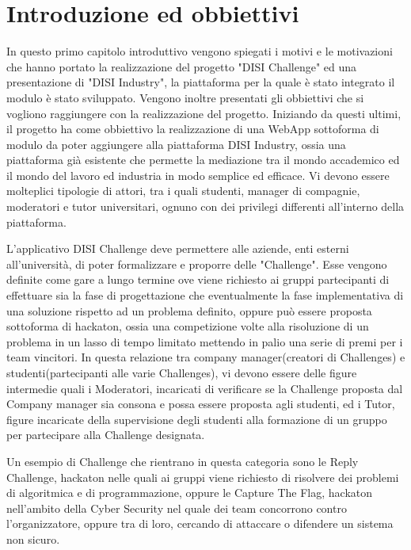 \chapter{Introduzione ed obbiettivi }
\label{cha:intro}
In questo primo capitolo introduttivo vengono spiegati i motivi e le motivazioni che hanno portato la realizzazione del progetto "DISI Challenge" ed una presentazione di "DISI Industry", la piattaforma per la quale è stato integrato il modulo è stato sviluppato. Vengono inoltre presentati gli obbiettivi che si vogliono raggiungere con la realizzazione del progetto.
Iniziando da questi ultimi, il progetto ha come obbiettivo la realizzazione di una WebApp sottoforma di modulo da poter aggiungere alla piattaforma DISI Industry, ossia una piattaforma già esistente che permette la mediazione tra il mondo accademico ed il mondo del lavoro ed industria in modo semplice ed efficace. Vi devono essere molteplici tipologie di attori, tra i quali studenti, manager di compagnie, moderatori e tutor universitari, ognuno con dei privilegi differenti all'interno della piattaforma. 


L'applicativo DISI Challenge deve permettere alle aziende, enti esterni all'università, di poter formalizzare e proporre delle "Challenge". Esse vengono definite come gare a lungo termine ove viene richiesto ai gruppi partecipanti di effettuare sia la fase di progettazione che eventualmente la fase implementativa di una soluzione rispetto ad un problema definito, oppure può essere proposta sottoforma di hackaton, ossia una competizione volte alla risoluzione di un problema in un lasso di tempo limitato mettendo in palio una serie di premi per i team vincitori. In questa relazione tra company manager(creatori di Challenges) e studenti(partecipanti alle varie Challenges), vi devono essere delle figure intermedie quali i Moderatori, incaricati di verificare se la Challenge proposta dal Company manager sia consona e possa essere proposta agli studenti, ed i Tutor, figure incaricate della supervisione degli studenti alla formazione di un gruppo per partecipare alla Challenge designata.

Un esempio di Challenge che rientrano in questa categoria sono le Reply Challenge, hackaton nelle quali ai gruppi viene richiesto di risolvere dei problemi di algoritmica e di programmazione, oppure le Capture The Flag, hackaton nell'ambito della Cyber Security nel quale dei team concorrono contro l'organizzatore, oppure tra di loro, cercando di attaccare o difendere un sistema non sicuro.

